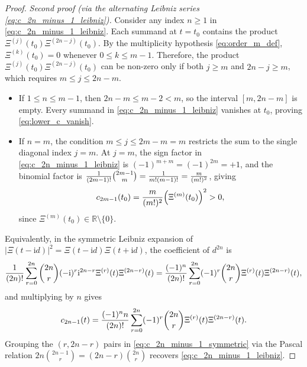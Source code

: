 \documentclass[11pt,reqno,a4paper]{amsart}
\theoremstyle{plain}
\theoremstyle{definition}
\theoremstyle{remark}
\numberwithin{equation}{section}
\newcommand{\fac}{\mathclose{\mathchar"0021}}
\newcommand{\ii}{\mathrm{i}}
\begin{document}
\begin{proof}
\medskip\noindent
\emph{Second proof (via the alternating Leibniz series \eqref{eq:c_2n_minus_1_leibniz}).}
Consider any index $n \ge 1$ in \eqref{eq:c_2n_minus_1_leibniz}. Each summand at $t = t_0$ contains the product $\Xi^{(j)}(t_0)\Xi^{(2n-j)}(t_0)$. By the multiplicity hypothesis \eqref{eq:order_m_def}, $\Xi^{(k)}(t_0) = 0$ whenever $0 \le k \le m-1$. Therefore, the product $\Xi^{(j)}(t_0)\Xi^{(2n-j)}(t_0)$ can be non-zero only if both $j \ge m$ and $2n - j \ge m$, which requires $m \le j \le 2n - m$.
\begin{itemize}[leftmargin=1.8em]
  \item If $1 \le n \le m - 1$, then $2n - m \le m - 2 < m$, so the interval $[m, 2n-m]$ is empty. Every summand in \eqref{eq:c_2n_minus_1_leibniz} vanishes at $t_0$, proving \eqref{eq:lower_c_vanish}.
  \item If $n = m$, the condition $m \le j \le 2m - m = m$ restricts the sum to the single diagonal index $j = m$. At $j = m$, the sign factor in \eqref{eq:c_2n_minus_1_leibniz} is $(-1)^{m+m} = (-1)^{2m} = +1$, and the binomial factor is $\frac{1}{(2m-1)\fac}\binom{2m-1}{m} = \frac{1}{m\fac(m-1)\fac} = \frac{m}{(m\fac)^2}$, giving
  \begin{equation*}
    c_{2m-1}(t_0) = \frac{m}{(m\fac)^2}\Big(\Xi^{(m)}(t_0)\Big)^2 > 0,
  \end{equation*}
  since $\Xi^{(m)}(t_0) \in \mathbb{R}\setminus\{0\}$.
\end{itemize}
Equivalently, in the symmetric Leibniz expansion of $|\Xi(t - \ii d)|^2 = \Xi(t - \ii d)\Xi(t + \ii d)$, the coefficient of $d^{2n}$ is
\begin{equation}\label{eq:leibniz_binom_general}
  \frac{1}{(2n)\fac}\sum_{r=0}^{2n}\binom{2n}{r}(-\ii)^r \ii^{2n-r}\Xi^{(r)}(t)\Xi^{(2n-r)}(t)
  = \frac{(-1)^n}{(2n)\fac}\sum_{r=0}^{2n}(-1)^r\binom{2n}{r}\Xi^{(r)}(t)\Xi^{(2n-r)}(t),
\end{equation}
and multiplying by $n$ gives
\begin{equation}\label{eq:c_2n_minus_1_symmetric}
  c_{2n-1}(t) = \frac{(-1)^n n}{(2n)\fac}\sum_{r=0}^{2n}(-1)^r\binom{2n}{r}\Xi^{(r)}(t)\Xi^{(2n-r)}(t).
\end{equation}
Grouping the $(r, 2n-r)$ pairs in \eqref{eq:c_2n_minus_1_symmetric} via the Pascal relation $2n\binom{2n-1}{r} = (2n-r)\binom{2n}{r}$ recovers \eqref{eq:c_2n_minus_1_leibniz}.
\end{proof}
\end{document}
